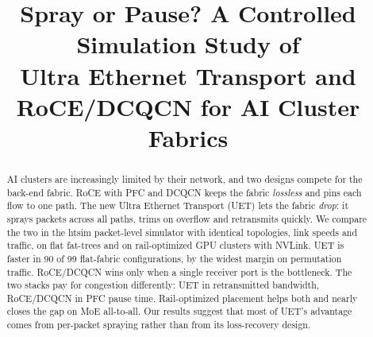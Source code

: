 \documentclass[conference]{IEEEtran}
\newcommand{\todo}[1]{\textcolor{red}{[TODO: #1]}}
\begin{document}
\title{Spray or Pause? A Controlled Simulation Study of\\
Ultra Ethernet Transport and RoCE/DCQCN for AI Cluster Fabrics}

\author{}

\maketitle

\begin{abstract}
AI clusters are increasingly limited by their network, and two designs compete
for the back-end fabric. RoCE with PFC and DCQCN keeps the fabric
\emph{lossless} and pins each flow to one path. The new Ultra Ethernet
Transport (UET) lets the fabric \emph{drop}: it sprays packets across all
paths, trims on overflow and retransmits quickly. We compare the two in the
htsim packet-level simulator with identical topologies, link speeds and
traffic, on flat fat-trees and on rail-optimized GPU clusters with NVLink.
UET is faster in 90 of 99 flat-fabric configurations, by the widest margin on
permutation traffic. RoCE/DCQCN wins only when a single receiver port is the
bottleneck. The two stacks pay for congestion differently: UET in retransmitted
bandwidth, RoCE/DCQCN in PFC pause time. Rail-optimized placement helps both
and nearly closes the gap on MoE all-to-all. Our results suggest that most of
UET's advantage comes from per-packet spraying rather than from its
loss-recovery design.
\end{abstract}
\end{document}
